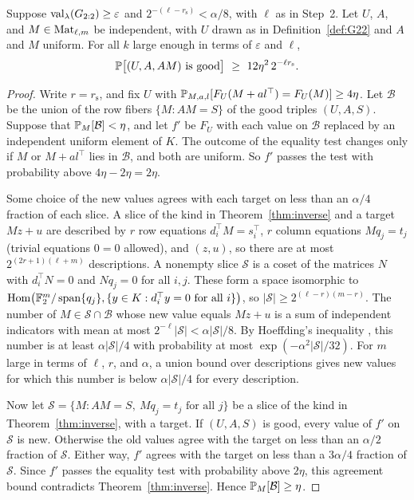 \begin{lemma}\label{lem:goodadvice}
Suppose $\operatorname{val}_\lambda(G_{2:2})\ge\varepsilon$ and $2^{-(\ell-r_{\mathrm s})}<\alpha/8$, with $\ell$ as in Step~2. Let $U$, $A$, and $M\in\operatorname{Mat}_{\ell,m}$ be independent, with $U$ drawn as in Definition~\ref{def:G22} and $A$ and $M$ uniform. For all $k$ large enough in terms of $\varepsilon$ and $\ell$,
\[
\Prob\bigl[(U,A,AM)\text{ is good}\bigr]\ \ge\ 12\eta^2\,2^{-\ell r_{\mathrm s}}.
\]
\end{lemma}

\begin{proof}
Write $r=r_{\mathrm s}$, and fix $U$ with $\mathbb{P}_{M,a,l}[F_U(M+al^\top)=F_U(M)]\ge4\eta$. Let $\mathcal B$ be the union of the row fibers $\{M:AM=S\}$ of the good triples $(U,A,S)$. Suppose that $\mathbb{P}_M[\mathcal B]<\eta$, and let $f'$ be $F_U$ with each value on $\mathcal B$ replaced by an independent uniform element of $K$. The outcome of the equality test changes only if $M$ or $M+al^\top$ lies in $\mathcal B$, and both are uniform. So $f'$ passes the test with probability above $4\eta-2\eta=2\eta$.

Some choice of the new values agrees with each target on less than an $\alpha/4$ fraction of each slice. A slice of the kind in Theorem~\ref{thm:inverse} and a target $Mz+u$ are described by $r$ row equations $d_i^\top M=s_i^\top$, $r$ column equations $Mq_j=t_j$ (trivial equations $0=0$ allowed), and $(z,u)$, so there are at most $2^{(2r+1)(\ell+m)}$ descriptions. A nonempty slice $\mathcal S$ is a coset of the matrices $N$ with $d_i^\top N=0$ and $Nq_j=0$ for all $i,j$. These form a space isomorphic to $\operatorname{Hom}\bigl(\mathbb{F}_2^m/\operatorname{span}\{q_j\},\{y\in K:d_i^\top y=0\text{ for all }i\}\bigr)$, so $|\mathcal S|\ge2^{(\ell-r)(m-r)}$. The number of $M\in\mathcal S\cap\mathcal B$ whose new value equals $Mz+u$ is a sum of independent indicators with mean at most $2^{-\ell}|\mathcal S|<\alpha|\mathcal S|/8$. By Hoeffding's inequality \cite[Theorem~2.2.6]{Ver26}, this number is at least $\alpha|\mathcal S|/4$ with probability at most $\exp(-\alpha^2|\mathcal S|/32)$. For $m$ large in terms of $\ell$, $r$, and $\alpha$, a union bound over descriptions gives new values for which this number is below $\alpha|\mathcal S|/4$ for every description.

Now let $\mathcal S=\{M:AM=S,\ Mq_j=t_j\text{ for all }j\}$ be a slice of the kind in Theorem~\ref{thm:inverse}, with a target. If $(U,A,S)$ is good, every value of $f'$ on $\mathcal S$ is new. Otherwise the old values agree with the target on less than an $\alpha/2$ fraction of $\mathcal S$. Either way, $f'$ agrees with the target on less than a $3\alpha/4$ fraction of $\mathcal S$. Since $f'$ passes the equality test with probability above $2\eta$, this agreement bound contradicts Theorem~\ref{thm:inverse}. Hence $\mathbb{P}_M[\mathcal B]\ge\eta$.


\end{proof}

